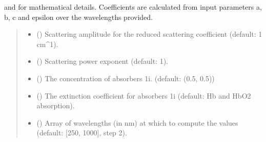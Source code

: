 \documentclass[letterpaper,10pt,english]{sphinxmanual}
\begin{document}
\begin{fulllineitems}
{}
\pysigstopsignatures\begin{description}
\sphinxAtStartPar
{\hyperref[\detokenize{generated/photon_canon.contrib.bio:photon_canon.contrib.bio.inverse_power_law_for_reduced_scattering}]{}} and {\hyperref[\detokenize{generated/photon_canon.contrib.bio:photon_canon.contrib.bio.spectroscopic_model_of_absorption}]{}} for
mathematical details. Coefficients are calculated from input parameters a, b, c and epsilon over the
wavelengths provided.

\end{description}
\begin{quote}\begin{description}
\begin{itemize}
\item {} 
\sphinxAtStartPar
{} () \textendash{} Scattering amplitude for the reduced scattering coefficient (default: 1 cm\textasciicircum{}\sphinxhyphen{}1).

\item {} 
\sphinxAtStartPar
{} () \textendash{} Scattering power exponent (default: 1).

\item {} 
\sphinxAtStartPar
{} (\sphinxstyleliteralemphasis{\sphinxupquote{{[}}}\sphinxstyleliteralemphasis{\sphinxupquote{{]}}}) \textendash{} The concentration of absorbers 1\sphinxhyphen{}i. (default: (0.5, 0.5))

\item {} 
\sphinxAtStartPar
{} (\sphinxstyleliteralemphasis{\sphinxupquote{{[}}}\sphinxstyleliteralemphasis{\sphinxupquote{{]}}}) \textendash{} The extinction coefficient for absorbers 1\sphinxhyphen{}i (default: Hb and HbO2 absorption).

\item {} 
\sphinxAtStartPar
{} (\sphinxstyleliteralemphasis{\sphinxupquote{{[}}}\sphinxstyleliteralemphasis{\sphinxupquote{{]}}}) \textendash{} Array of wavelengths (in nm) at which to compute the values (default: {[}250, 1000{]}, step 2).


\end{itemize}
\end{description}
\end{quote}
\end{fulllineitems}
\end{document}
